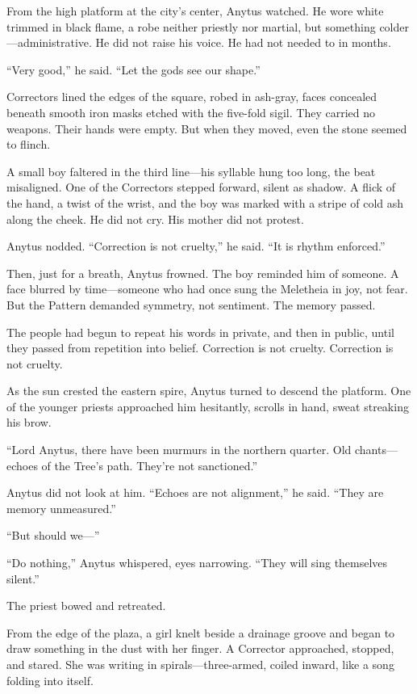 \documentclass[12pt]{article}
\begin{document}
From the high platform at the city’s center, Anytus watched. He wore white trimmed in black flame, a robe neither priestly nor martial, but something colder—administrative. He did not raise his voice. He had not needed to in months.

“Very good,” he said. “Let the gods see our shape.”

Correctors lined the edges of the square, robed in ash-gray, faces concealed beneath smooth iron masks etched with the five-fold sigil. They carried no weapons. Their hands were empty. But when they moved, even the stone seemed to flinch.

A small boy faltered in the third line—his syllable hung too long, the beat misaligned. One of the Correctors stepped forward, silent as shadow. A flick of the hand, a twist of the wrist, and the boy was marked with a stripe of cold ash along the cheek. He did not cry. His mother did not protest.

Anytus nodded. “Correction is not cruelty,” he said. “It is rhythm enforced.”

Then, just for a breath, Anytus frowned. The boy reminded him of someone. A face blurred by time—someone who had once sung the Meletheia in joy, not fear. But the Pattern demanded symmetry, not sentiment. The memory passed.

The people had begun to repeat his words in private, and then in public, until they passed from repetition into belief. Correction is not cruelty. Correction is not cruelty.

As the sun crested the eastern spire, Anytus turned to descend the platform. One of the younger priests approached him hesitantly, scrolls in hand, sweat streaking his brow.

“Lord Anytus, there have been murmurs in the northern quarter. Old chants—echoes of the Tree’s path. They’re not sanctioned.”

Anytus did not look at him. “Echoes are not alignment,” he said. “They are memory unmeasured.”

“But should we—”

“Do nothing,” Anytus whispered, eyes narrowing. “They will sing themselves silent.”

The priest bowed and retreated.

From the edge of the plaza, a girl knelt beside a drainage groove and began to draw something in the dust with her finger. A Corrector approached, stopped, and stared. She was writing in spirals—three-armed, coiled inward, like a song folding into itself.
\end{document}
